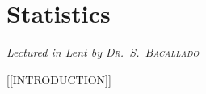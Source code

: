 \chapter[Statistics \\ \textnormal{\emph{Lectured in Lent \oldstylenums{2022} by \textsc{Dr.\ S.\ Bacallado}}}]{Statistics}
\emph{\Large Lectured in Lent  by \textsc{Dr.\ S.\ Bacallado}}

[[INTRODUCTION]]


